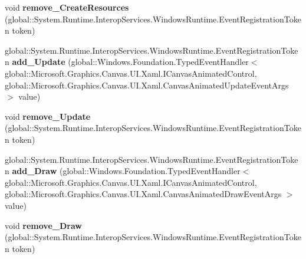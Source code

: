 \begin{DoxyCompactItemize}
void {\bfseries remove\+\_\+\+Create\+Resources} (global\+::\+System.\+Runtime.\+Interop\+Services.\+Windows\+Runtime.\+Event\+Registration\+Token token)
\item 
\mbox{\label{class_microsoft_1_1_graphics_1_1_canvas_1_1_u_i_1_1_xaml_1_1_canvas_animated_control_aa7a0e408eb82cfc307935e5bb671c4b8}} 
global\+::\+System.\+Runtime.\+Interop\+Services.\+Windows\+Runtime.\+Event\+Registration\+Token {\bfseries add\+\_\+\+Update} (global\+::\+Windows.\+Foundation.\+Typed\+Event\+Handler$<$ global\+::\+Microsoft.\+Graphics.\+Canvas.\+U\+I.\+Xaml.\+I\+Canvas\+Animated\+Control, global\+::\+Microsoft.\+Graphics.\+Canvas.\+U\+I.\+Xaml.\+Canvas\+Animated\+Update\+Event\+Args $>$ value)
\item 
\mbox{\label{class_microsoft_1_1_graphics_1_1_canvas_1_1_u_i_1_1_xaml_1_1_canvas_animated_control_a16a7c17d34f9282e536a02fcb511bb4e}} 
void {\bfseries remove\+\_\+\+Update} (global\+::\+System.\+Runtime.\+Interop\+Services.\+Windows\+Runtime.\+Event\+Registration\+Token token)
\item 
\mbox{\label{class_microsoft_1_1_graphics_1_1_canvas_1_1_u_i_1_1_xaml_1_1_canvas_animated_control_afacf0f7ca405ccd98c5a6ae333a7fc12}} 
global\+::\+System.\+Runtime.\+Interop\+Services.\+Windows\+Runtime.\+Event\+Registration\+Token {\bfseries add\+\_\+\+Draw} (global\+::\+Windows.\+Foundation.\+Typed\+Event\+Handler$<$ global\+::\+Microsoft.\+Graphics.\+Canvas.\+U\+I.\+Xaml.\+I\+Canvas\+Animated\+Control, global\+::\+Microsoft.\+Graphics.\+Canvas.\+U\+I.\+Xaml.\+Canvas\+Animated\+Draw\+Event\+Args $>$ value)
\item 
\mbox{\label{class_microsoft_1_1_graphics_1_1_canvas_1_1_u_i_1_1_xaml_1_1_canvas_animated_control_a1c98ae37b09c9d6d53a47f8e303430ad}} 
void {\bfseries remove\+\_\+\+Draw} (global\+::\+System.\+Runtime.\+Interop\+Services.\+Windows\+Runtime.\+Event\+Registration\+Token token)
\item 
\mbox{\label{class_microsoft_1_1_graphics_1_1_canvas_1_1_u_i_1_1_xaml_1_1_canvas_animated_control_a1a3af8188976d58864922e96695f8eac}} 

\end{DoxyCompactItemize}
